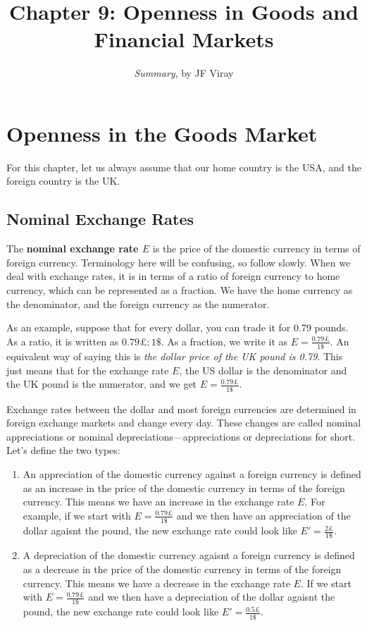 \documentclass{extarticle}
\title{\vspace{-2em}Chapter 9: Openness in Goods and Financial Markets}
\author{\emph{Summary}, by JF Viray}
\date{}
\begin{document}
\maketitle

\section{Openness in the Goods Market}
For this chapter, let us always assume that our home country is the USA, and the foreign country is the UK. 

\subsection{Nominal Exchange Rates}
The \textbf{nominal exchange rate $E$} is the price of the domestic currency in terms of foreign currency. 
Terminology here will be confusing, so follow slowly. When we deal with exchange rates, it is in terms of a ratio of foreign currency to home currency, which can be represented as a fraction. We have the home currency as the denominator, and the foreign currency as the numerator. 

As an example, suppose that for every dollar, you can trade it for 0.79 pounds. As a ratio, it is written as $0.79 \pounds : 1 \$$. As a fraction, we write it as $E = \frac{0.79 \pounds}{1 \$}$. 
An equivalent way of saying this is \textit{the dollar price of the UK pound is 0.79}. This just means that for the exchange rate $E$, the US dollar is the denominator and the UK pound is the numerator, and we get $E = \frac{0.79 \pounds}{1 \$}$.

Exchange rates between the dollar and most foreign currencies are determined in foreign exchange markets and change every day. 
These changes are called nominal appreciations or nominal depreciations—appreciations or depreciations for short. Let's define the two types:
\begin{enumerate}
    \item An appreciation of the domestic currency against a foreign currency is defined as an increase in the price of the domestic currency in terms of the foreign currency. This means we have an increase in the exchange rate $E$.
    For example, if we start with $E = \frac{0.79 \pounds}{1 \$}$ and we then have an appreciation of the dollar agaisnt the pound, the new exchange rate could look like $E' = \frac{2 \pounds}{1 \$}$.
    \item A depreciation of the domestic currency agaisnt a foreign currency is defined as a decrease in the price of the domestic currency in terms of the foreign currency. This means we have a decrease in the exchange rate $E$.
    If we start with $E = \frac{0.79 \pounds}{1 \$}$ and we then have a depreciation of the dollar agaisnt the pound, the new exchange rate could look like $E' = \frac{0.5 \pounds}{1 \$}$.
\end{enumerate}
\end{document}
